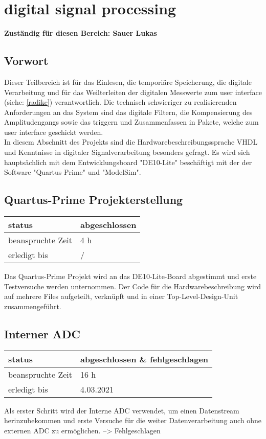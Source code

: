 \section{digital signal processing} \label{sauer}
\textbf{Zuständig für diesen Bereich: Sauer Lukas}\\
\subsection{Vorwort}
Dieser Teilbereich ist für das Einlesen, die temporiäre Speicherung, die digitale Verarbeitung und für das Weilterleiten der digitalen Messwerte zum user interface (siehe: \ref{radike}) verantwortlich. Die technisch schwieriger zu realisierenden Anforderungen an das System sind das digitale Filtern, die Kompensierung des Amplitudengangs sowie das triggern und Zusammenfassen in Pakete, welche zum user interface geschickt werden.\\
In diesem Abschnitt des Projekts sind die Hardwarebeschreibungssprache VHDL und Kenntnisse in digitaler Signalverarbeitung besonders gefragt. Es wird sich hauptsächlich mit dem Entwicklungsboard "DE10-Lite" beschäftigt mit der der Software "Quartus Prime" und "ModelSim".

\subsection{Quartus-Prime Projekterstellung}

\begin{tabular}[h]{|l|l|} %
	\hline
	status & abgeschlossen\\
	\hline
	beanspruchte Zeit & 4 h\\
	\hline
	erledigt bis & / \\
	\hline
\end{tabular}
Das Quartus-Prime Projekt wird an das DE10-Lite-Board abgestimmt und erste Testversuche werden unternommen. Der Code für die Hardwarebeschreibung wird auf mehrere Files aufgeteilt, verknüpft und in einer Top-Level-Design-Unit zusammengeführt. 

\subsection{Interner ADC}

\begin{tabular}[h]{|l|l|} %
	\hline
	status & abgeschlossen \& fehlgeschlagen\\
	\hline
	beanspruchte Zeit & 16 h\\
	\hline
	erledigt bis & 4.03.2021 \\
	\hline
\end{tabular}
Als erster Schritt wird der Interne ADC verwendet, um einen Datenstream herinzubekommen und erste Versuche für die weiter Datenverarbeitung auch ohne externen ADC zu ermöglichen. --> Fehlgeschlagen

